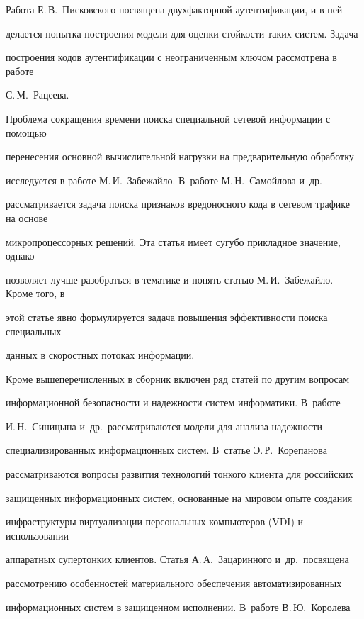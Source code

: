      Работа Е.\,В.~Писковского посвящена двухфакторной аутентификации, и в ней 


делается попытка построения модели для оценки стойкости таких систем. Задача 


построения кодов аутентификации с неограниченным ключом рассмотрена в работе 


С.\,М.~Рацеева.


     


     Проблема сокращения времени поиска специальной сетевой информации с помощью 


перенесения основной вычислительной нагрузки на предварительную обработку 


исследуется в работе М.\,И.~Забежайло. В~работе М.\,Н.~Самойлова и~др.\ 


рассматривается задача поиска признаков вредоносного кода в сетевом трафике на основе 


микропроцессорных решений. Эта статья имеет сугубо прикладное значение, однако 


позволяет лучше разобраться в тематике и понять статью М.\,И.~Забежайло. Кроме того, в 


этой статье явно формулируется задача повышения эффективности поиска специальных 


данных в скоростных потоках информации. 


     


     Кроме вышеперечисленных в сборник включен ряд статей по другим вопросам 


информационной безопасности и надежности систем информатики. В~работе 


И.\,Н.~Синицына и~др.\ рассматриваются модели для анализа надежности 


специализированных информационных систем. В~статье Э.\,Р.~Корепанова 


рассматриваются вопросы развития технологий тонкого клиента для российских 


защищенных информационных систем, основанные на мировом опыте создания 


инфраструктуры виртуализации персональных компьютеров (VDI) и использовании 


аппаратных супертонких клиентов. Статья А.\,А.~Зацаринного и~др.\ посвящена 


рассмотрению особенностей материального обеспечения автоматизированных 


информационных сис\-тем в защищенном исполнении. В~работе В.\,Ю.~Королева 


